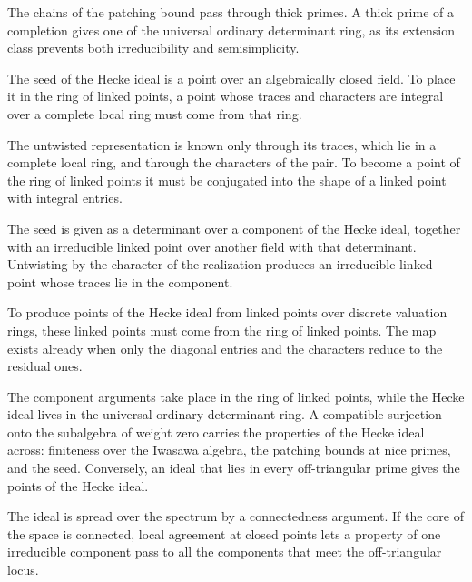 The chains of the patching bound pass through thick primes. A thick prime of a completion gives one of the universal ordinary determinant ring, as its extension class prevents both irreducibility and semisimplicity.

The seed of the Hecke ideal is a point over an algebraically closed field. To place it in the ring of linked points, a point whose traces and characters are integral over a complete local ring must come from that ring.

The untwisted representation is known only through its traces, which lie in a complete local ring, and through the characters of the pair. To become a point of the ring of linked points it must be conjugated into the shape of a linked point with integral entries.

The seed is given as a determinant over a component of the Hecke ideal, together with an irreducible linked point over another field with that determinant. Untwisting by the character of the realization produces an irreducible linked point whose traces lie in the component.

To produce points of the Hecke ideal from linked points over discrete valuation rings, these linked points must come from the ring of linked points. The map exists already when only the diagonal entries and the characters reduce to the residual ones.

The component arguments take place in the ring of linked points, while the Hecke ideal lives in the universal ordinary determinant ring. A compatible surjection onto the subalgebra of weight zero carries the properties of the Hecke ideal across: finiteness over the Iwasawa algebra, the patching bounds at nice primes, and the seed. Conversely, an ideal that lies in every off-triangular prime gives the points of the Hecke ideal.

The ideal is spread over the spectrum by a connectedness argument. If the core of the space is connected, local agreement at closed points lets a property of one irreducible component pass to all the components that meet the off-triangular locus.

